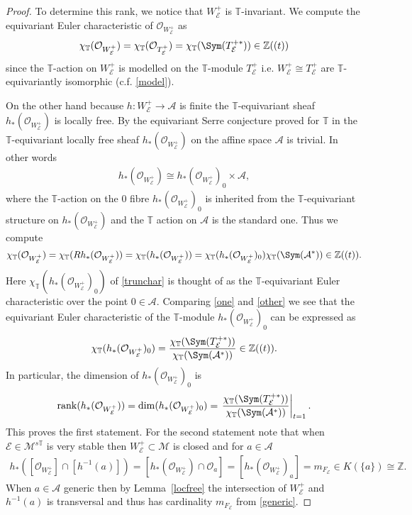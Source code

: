 \documentclass[12pt]{article}
\numberwithin{equation}{section}
\theoremstyle{remark}
\theoremstyle{definition}
\numberwithin{theorem}{section}
\def\beq{\begin{eqnarray}}
\def\eeq{\end{eqnarray}}
\def\calE{{\mathcal E}}
\DeclareMathOperator{\rank}{rank}
\def\M{{\mathcal{M}}}
\def\calA{{\mathcal{A}}}
\newcommand{\T}{{\mathbb{T}}}
\def\calO{{\mathcal O}}
\def\Z{\mathbb{Z}}
\renewcommand{\1}{\mathbbm{1}}
\begin{document}
\begin{proof}
	To determine this rank, we notice that  $W^+_\calE$ is $\T$-invariant. %
	We  compute the equivariant Euler characteristic of $\calO_{W^+_\calE}$  as \beq \label{one}\chi_\T(\calO_{W^+_\calE})=\chi_\T(\calO_{T_\calE^+})= \chi_\T(\Sym(T_\calE^{+*}))\in\Z((t))\eeq since the $\T$-action on $W^+_\calE$ is modelled on the $\T$-module $T_\calE^+$ i.e. $W^+_\calE\cong T_\calE^+$ are $\T$-equivariantly isomorphic (c.f. \eqref{model}). 
	
	On the other hand because $h:W^+_{\calE}\to \calA$ is finite the $\T$-equivariant sheaf $h_*(\calO_{W^+_\calE})$ is locally free. By the equivariant  Serre conjecture proved for $\T$ in \cite{equserre} the $\T$-equivariant locally free sheaf $h_*(\calO_{W^+_\calE})$ on the affine space $\calA$ is trivial. In other words \beq\label{hitchinpush}h_*(\calO_{W^+_\calE})\cong h_*(\calO_{W^+_\calE})_0\times \calA,\eeq where the $\T$-action on the $0$ fibre  $h_*(\calO_{W^+_\calE})_0$ is inherited from the $\T$-equivariant structure on $h_*(\calO_{W^+_\calE})$ and the $\T$ action on $\calA$ is the standard one.  Thus we  compute \beq \label{other}\chi_\T(\calO_{W^+_\calE})=\chi_\T(Rh_*(\calO_{W^+_\calE}))=\chi_\T(h_*(\calO_{W^+_\calE}))=\chi_\T(h_*(\calO_{W^+_\calE})_0) \chi_\T(\Sym(\calA^*)) \in \Z((t)).\eeq Here  $\chi_\T(h_*(\calO_{W^+_\calE})_0)$ of \eqref{trunchar} is thought of as the $\T$-equivariant Euler characteristic over the point $0\in \calA$.
	Comparing \eqref{one} and \eqref{other} we see that the equivariant Euler characteristic of the $\T$-module $h_*(\calO_{W^+_\calE})_0$ can be expressed as \beq \label{t-character}\chi_\T(h_*(\calO_{W^+_\calE})_0)={ \chi_\T(\Sym(T^{+*}_\calE))\over \chi_\T(\Sym(\calA^*))}\in \Z((t)).\eeq In particular, the dimension of $h_*(\calO_{W^+_\calE})_0$ is $$\rank(h_*(\calO_{W^+_\calE}))=\dim(h_*(\calO_{W^+_\calE})_0)=\left. { \chi_\T(\Sym(T^{+*}_\calE))\over \chi_\T(\Sym(\calA^*))}\right|_{t=1}.$$
	This proves the first statement. For the second statement note that 
	when $\calE\in \M^{s\T}$ is very stable then $W^+_\calE\subset \M$ is closed and for   $a\in\calA$ \beq \label{generic}h_*([\calO_{W^+_\calE}]\cap [h^{-1}(a)])=[h_*(\calO_{W^+_\calE})\cap \calO_a]=[h_*(\calO_{W^+_\calE})_a]=m_{F_\calE}\in K(\{a\})\cong \Z.\eeq When $a\in \calA$ generic then by Lemma~\ref{locfree} the intersection of $W^+_\calE$ and $h^{-1}(a)$ is transversal and thus has cardinality $m_{F_\calE}$ from \eqref{generic}.
	
	
\end{proof}
\end{document}
